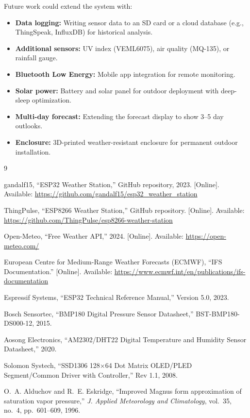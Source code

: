 \documentclass[conference]{IEEEtran}
\begin{document}
Future work could extend the system with:
\begin{itemize}
    \item \textbf{Data logging:} Writing sensor data to an SD card or a cloud database (e.g., ThingSpeak, InfluxDB) for historical analysis.
    \item \textbf{Additional sensors:} UV index (VEML6075), air quality (MQ-135), or rainfall gauge.
    \item \textbf{Bluetooth Low Energy:} Mobile app integration for remote monitoring.
    \item \textbf{Solar power:} Battery and solar panel for outdoor deployment with deep-sleep optimization.
    \item \textbf{Multi-day forecast:} Extending the forecast display to show 3--5 day outlooks.
    \item \textbf{Enclosure:} 3D-printed weather-resistant enclosure for permanent outdoor installation.
\end{itemize}


\begin{thebibliography}{9}

gandalf15, ``ESP32 Weather Station,'' GitHub repository, 2023. [Online]. Available: \url{https://github.com/gandalf15/esp32_weather_station}

ThingPulse, ``ESP8266 Weather Station,'' GitHub repository. [Online]. Available: \url{https://github.com/ThingPulse/esp8266-weather-station}

Open-Meteo, ``Free Weather API,'' 2024. [Online]. Available: \url{https://open-meteo.com/}

European Centre for Medium-Range Weather Forecasts (ECMWF), ``IFS Documentation.'' [Online]. Available: \url{https://www.ecmwf.int/en/publications/ifs-documentation}

Espressif Systems, ``ESP32 Technical Reference Manual,'' Version 5.0, 2023.

Bosch Sensortec, ``BMP180 Digital Pressure Sensor Datasheet,'' BST-BMP180-DS000-12, 2015.

Aosong Electronics, ``AM2302/DHT22 Digital Temperature and Humidity Sensor Datasheet,'' 2020.

Solomon Systech, ``SSD1306 128$\times$64 Dot Matrix OLED/PLED Segment/Common Driver with Controller,'' Rev 1.1, 2008.

O.~A. Alduchov and R.~E. Eskridge, ``Improved Magnus form approximation of saturation vapor pressure,'' \textit{J. Applied Meteorology and Climatology}, vol.~35, no.~4, pp.~601--609, 1996.

\end{thebibliography}
\end{document}

